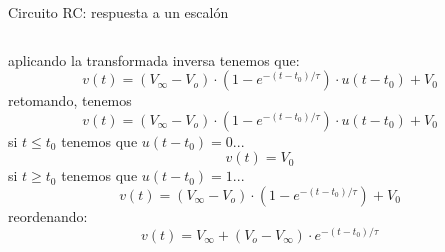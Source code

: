 \documentclass[aspectratio=169]{beamer}
\begin{document}
\begin{frame}{Circuito RC: respuesta a un escalón}
\begin{columns}
\begin{column}{0.5\textwidth}
{{\begin{equation*}
                \end{equation*}
            }
                {aplicando la transformada inversa tenemos que:
                \begin{equation*}
                    v(t) = (V_\infty - V_o) \cdot (1 - e^{-(t-t_0)/\tau}) \cdot u(t-t_0) + V_0
                \end{equation*}
            }
        }
            {
            {retomando, tenemos
                \begin{equation*}
                    v(t) = (V_\infty - V_o) \cdot (1 - e^{-(t-t_0)/\tau}) \cdot u(t-t_0) + V_0
                \end{equation*}
            }
                {si $t\leq t_0$ tenemos que $u(t-t_0) = 0$...
                \begin{equation*}
                     v(t) = V_0
                \end{equation*}
            }
                {si $t\geq t_0$ tenemos que $u(t-t_0) = 1$...
                \begin{equation*}
                     v(t) = (V_\infty - V_o) \cdot (1 - e^{-(t-t_0)/\tau}) + V_0
                \end{equation*}
            }
                {reordenando: 
                \begin{equation*}
                     v(t) = V_\infty + (V_o - V_\infty) \cdot e^{-(t-t_0)/\tau}
                \end{equation*}
            }
        }
    \end{column}
\end{columns}
\end{frame}
\end{document}
